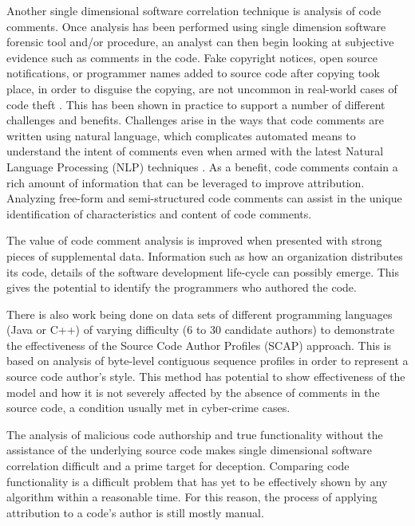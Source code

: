 \documentclass[12pt]{report}
\begin{document}
Another single dimensional software correlation technique is analysis of code comments.  Once analysis has been performed using single dimension software forensic tool and/or procedure, an analyst can then begin looking at subjective evidence such as comments in the code.  Fake copyright notices, open source notifications, or programmer names added to source code after copying took place, in order to disguise the copying, are not uncommon in real-world cases of code theft \cite{sfbook:2011}.  This has been shown in practice to support a number of different challenges and benefits.  Challenges arise in the ways that code comments are written using natural language, which complicates automated means to understand the intent of comments even when armed with the latest Natural Language Processing (NLP) techniques \cite{artsci:2015}.  As a benefit, code comments contain a rich amount of information that can be leveraged to improve attribution.  Analyzing free-form and semi-structured code comments can assist in the unique identification of characteristics and content of code comments.

The value of code comment analysis is improved when presented with strong pieces of supplemental data.  Information such as how an organization distributes its code, details of the software development life-cycle can possibly emerge.  This gives the potential to identify the programmers who authored the code.  

There is also work being done on data sets of different programming languages (Java or C++) of varying difficulty (6 to 30 candidate authors) to demonstrate the effectiveness of the Source Code Author Profiles (SCAP) approach.  This is based on analysis of byte-level contiguous sequence profiles in order to represent a source code author’s style.  \cite{IFIP:2006} This method has potential to show effectiveness of the model and how it is not severely affected by the absence of comments in the source code, a condition usually met in cyber-crime cases.

The analysis of malicious code authorship and true functionality without the assistance of the underlying source code makes single dimensional software correlation difficult and a prime target for deception.  Comparing code functionality is a difficult problem that has yet to be effectively shown by any algorithm within a reasonable time.  For this reason, the process of applying attribution to a code's author is still mostly manual.
\end{document}
